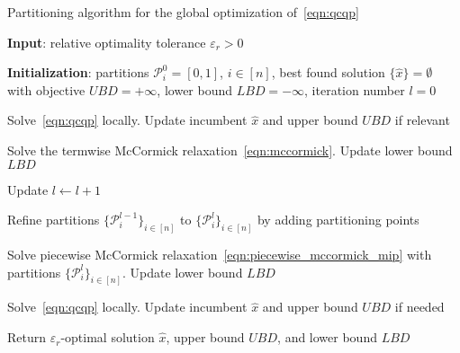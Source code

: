 \documentclass{article}
\DeclarePairedDelimiter\abs{\lvert}{\rvert}%
\begin{document}
\begin{algorithm}[t]
\caption{Partitioning algorithm for the global optimization of~\eqref{eqn:qcqp}}
\label{alg:partitioning_algorithm}
{
\begin{algorithmic}[1]

\State \textbf{Input}: relative optimality tolerance $\varepsilon_r > 0$

\State \textbf{Initialization}: partitions $\mathcal{P}^0_i = [0, 1]$, $i \in [n]$, best found solution $\{\hat{x}\} = \emptyset$ with objective $UBD = +\infty$, lower bound $LBD = -\infty$, iteration number $l = 0$

\vspace*{0.05in}
\State Solve~\eqref{eqn:qcqp} locally. Update incumbent $\hat{x}$ and upper bound $UBD$ if relevant

\vspace*{0.05in}
\State Solve the termwise McCormick relaxation~\eqref{eqn:mccormick}. Update lower bound $LBD$


\vspace*{0.05in}

\State Update $l \leftarrow l+1$


\State\label{step:refine_part}Refine partitions $\{\mathcal{P}^{l-1}_i\}_{i \in [n]}$ to $\{\mathcal{P}^{l}_i\}_{i \in [n]}$ by adding partitioning points

\State Solve piecewise McCormick relaxation~\eqref{eqn:piecewise_mccormick_mip} with partitions $\{\mathcal{P}^{l}_i\}_{i \in [n]}$. Update lower bound $LBD$

\State Solve~\eqref{eqn:qcqp} locally. Update incumbent $\hat{x}$ and upper bound $UBD$ if needed 

\EndWhile


\vspace*{0.05in}
\State Return $\varepsilon_r$-optimal solution $\hat{x}$, upper bound $UBD$, and lower bound $LBD$


\end{algorithmic}
}
\end{algorithm}
\end{document}

